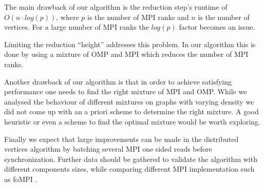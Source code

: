 The main drawback of our algorithm is the reduction step's runtime of $O\left(n \cdot
log\left(p\right)\right)$, where $p$ is the number of MPI ranks and $n$ is the number of vertices.
For a large number of MPI ranks the $log\left(p\right)$ factor becomes an issue.

Limiting the reduction ``height'' addresses this problem. In our algorithm this is done by using a
mixture of OMP and MPI which reduces the number of MPI ranks.

%

Another drawback of our algorithm is that in order to achieve satisfying performance one needs to
find the right mixture of MPI and OMP. While we analysed the behaviour of different mixtures on
graphs with varying density we did not come up with an a priori scheme to determine the right
mixture. A good heuristic or even a scheme to find the optimal mixture would be worth exploring.


Finally we expect that large improvements can be made in the distributed vertices algorithm
by batching several MPI one sided reads
before synchronization. Further data should be gathered to validate the algorithm
with different components sizes, while comparing different MPI implementation such as
foMPI \cite{fompi-mpi3-one-sided}.
